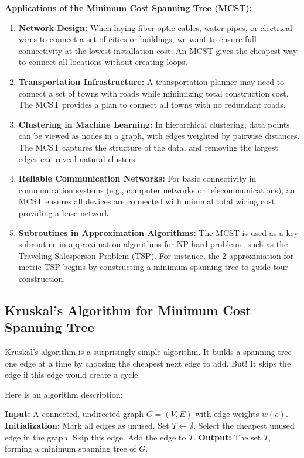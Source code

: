 \textbf{Applications of the Minimum Cost Spanning Tree (MCST):}
\begin{enumerate}
    \item \textbf{Network Design:} When laying fiber optic cables, water pipes, or electrical wires to connect a set of cities or buildings, we want to ensure full connectivity at the lowest installation cost. An MCST gives the cheapest way to connect all locations without creating loops.

    \item \textbf{Transportation Infrastructure:} A transportation planner may need to connect a set of towns with roads while minimizing total construction cost. The MCST provides a plan to connect all towns with no redundant roads.

    \item \textbf{Clustering in Machine Learning:} In hierarchical clustering, data points can be viewed as nodes in a graph, with edges weighted by pairwise distances. The MCST captures the structure of the data, and removing the largest edges can reveal natural clusters.

    \item \textbf{Reliable Communication Networks:} For basic connectivity in communication systems (e.g., computer networks or telecommunications), an MCST ensures all devices are connected with minimal total wiring cost, providing a base network.

    \item \textbf{Subroutines in Approximation Algorithms:} The MCST is used as a key subroutine in approximation algorithms for NP-hard problems, such as the Traveling Salesperson Problem (TSP). For instance, the 2-approximation for metric TSP begins by constructing a minimum spanning tree to guide tour construction.
\end{enumerate}

\subsection{Kruskal's Algorithm for Minimum Cost Spanning Tree}
\label{subsec:gt-kruskal}
Kruskal's algorithm is a surprisingly simple algorithm.  It builds a spanning tree one edge at a time by choosing the cheapest next edge to add.  But!  It skips the edge if this edge would create a cycle.

Here is an algorithm description:
\begin{algorithm}[H]
\caption{Kruskal's Algorithm (Descriptive Version)}
\begin{algorithmic}[1]
\State \textbf{Input:} A connected, undirected graph \( G = (V, E) \) with edge weights \( w(e) \).
\State \textbf{Initialization:} Mark all edges as unused. Set \( T \gets \emptyset \).
\Repeat
  \State Select the cheapest unused edge in the graph.
    \State Skip this edge.
  \Else
    \State Add the edge to \( T \).
  \EndIf
{}
\State \textbf{Output:} The set \( T \), forming a minimum spanning tree of \( G \).
\end{algorithmic}
\end{algorithm}

